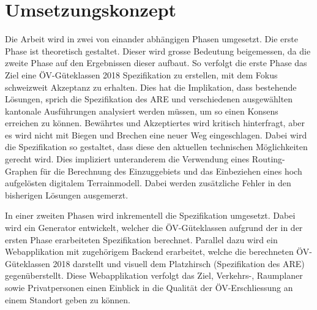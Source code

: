 
\section{Umsetzungskonzept}
\label{Umsetzungskonzept}

Die Arbeit wird in zwei von einander abhängigen Phasen umgesetzt.
Die erste Phase ist theoretisch gestaltet.
Dieser wird grosse Bedeutung beigemessen, da die zweite Phase auf den Ergebnissen dieser aufbaut.
So verfolgt die erste Phase das Ziel eine \acs{ÖV}-Güteklassen 2018 Spezifikation zu erstellen, mit dem Fokus schweizweit Akzeptanz zu erhalten.
Dies hat die Implikation, dass bestehende Lösungen, sprich die Spezifikation des \acl{ARE} und verschiedenen ausgewählten kantonale Ausführungen analysiert werden müssen, um so einen Konsens erreichen zu können.
Bewährtes und Akzeptiertes wird kritisch hinterfragt, aber es wird nicht mit Biegen und Brechen eine neuer Weg eingeschlagen.
Dabei wird die Spezifikation so gestaltet, dass diese den aktuellen technischen Möglichkeiten gerecht wird.
Dies impliziert unteranderem die Verwendung eines Routing-Graphen für die Berechnung des Einzuggebiets und das Einbeziehen eines hoch aufgelösten digitalem Terrainmodell.
Dabei werden zusätzliche Fehler in den bisherigen Lösungen ausgemerzt.

In einer zweiten Phasen wird inkrementell die Spezifikation umgesetzt.
Dabei wird ein Generator entwickelt, welcher die \acs{ÖV}-Güteklassen aufgrund der in der ersten Phase erarbeiteten Spezifikation berechnet.
Parallel dazu wird ein Webapplikation mit zugehörigem Backend erarbeitet, welche die berechneten \acs{ÖV}-Güteklassen 2018 darstellt und visuell dem Platzhirsch (Spezifikation des \acl{ARE}) gegenüberstellt.
Diese Webapplikation verfolgt das Ziel, Verkehrs-, Raumplaner sowie Privatpersonen einen Einblick in die Qualität der ÖV-Erschliessung an einem Standort geben zu können.
